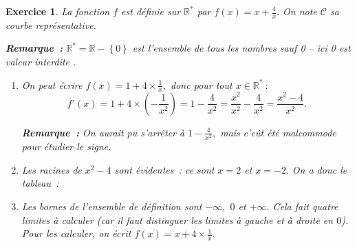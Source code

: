 \documentclass[10pt]{article}
\newtheorem{exo}{Exercice}
\begin{document}
\begin{exo}

La fonction $f$ est définie sur $\mathbb{R}^*$ par $f(x)=x+\frac{4}{x}.$ On note $\mathcal{C}$ sa courbe représentative.

\medskip

\textbf{Remarque~:} $\mathbb{R}^*=\mathbb{R}-\left\{0\right\}$ est l'ensemble de tous les nombres sauf 0 -- ici 0 est \og valeur interdite \fg.

\begin{enumerate}
\item On peut écrire $f(x)=1+4\times\frac{1}{x},$ donc pour tout $x\in \mathbb{R}^*~:$
\[f'(x)=1+4\times\left(-\frac{1}{x^2}\right)=1-\frac{4}{x^2}=\frac{x^2}{x^2}-\frac{4}{x^2}=\frac{x^2-4}{x^2}.\]

\medskip

\textbf{Remarque~:} On aurait pu s'arrêter à $1-\frac{4}{x^2},$ mais c'eût été malcommode pour étudier le signe.

\item Les racines de $x^2-4$ sont évidentes~: ce sont $x=2$ et $x=-2.$ On a donc le tableau~:

\medskip
\begin{center}
\end{center}
\item Les bornes de l'ensemble de définition sont $-\infty,$ $0$ et $+\infty.$ Cela fait quatre limites à calculer (car il faut distinguer les limites à gauche et à droite en $0$). Pour les calculer, on écrit $f(x)=x+4\times\frac{1}{x}.$

\medskip


\end{enumerate}
\end{exo}
\end{document}
